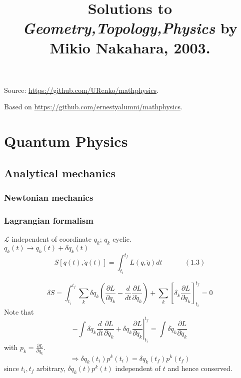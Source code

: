 \documentclass{book}
\title{
Solutions to \emph{Geometry,Topology,Physics} by Mikio Nakahara, 2003.  
}
\begin{document}

\maketitle

Source: \url{https://github.com/URenko/mathphysics}.

Based on \url{https://github.com/ernestyalumni/mathphysics}.

\chapter{Quantum Physics}

\section{Analytical mechanics}

\subsection{Newtonian mechanics}

\subsection{Lagrangian formalism}

$\mathcal{L}$ independent of coordinate $q_k$; $q_k$ cyclic.  \\

$q_k(t) \to q_k(t) + \delta q_k(t)$
\begin{equation}
S[q(t), \dot{q}(t) ] = \int_{t_i}^{t_f} L(q,\dot{q}) dt \quad \quad \quad \, (1.3)
\end{equation}

\[
\delta S = \int_{t_i}^{t_f} \sum_k \delta q_k \left( \frac{ \partial L}{ \partial q_k} - \frac{d}{dt} \frac{ \partial L}{ \partial \dot{q}_k } \right) + \sum_k \left[ \delta_k \frac{ \partial L}{ \partial \dot{q}_k} \right]_{t_i}^{t_f} = 0 
\]
Note that 
\[
- \int \delta q_k \frac{d}{dt} \frac{ \partial L}{ \partial \dot{q}_k } + \delta q_k \left. \frac{ \partial L}{ \partial \dot{q}_k} \right|_{t_i}^{t_f} = \int \delta \dot{q}_k \frac{ \partial L}{ \partial \dot{q}_k }
\]
with $p_k = \frac{ \partial L}{ \partial \dot{q}_k}$.  
\begin{equation}
\Longrightarrow \delta q_k(t_i) p^k(t_i) = \delta q_k(t_f) p^k(t_f)
\end{equation}
since $t_i,t_f$ arbitrary, $\delta q_k(t) p^k(t)$ independent of $t$ and hence conserved.
\end{document}
